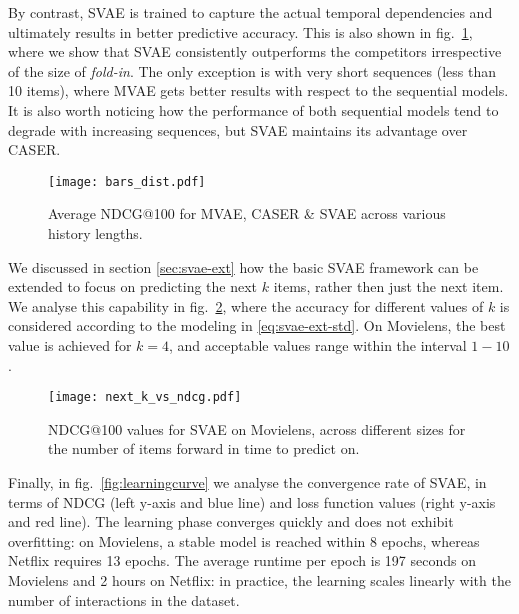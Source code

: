 \documentclass[sigconf]{acmart}
\numberwithin{equation}{section}
\begin{document}
By contrast, SVAE is trained to capture the actual temporal
dependencies and ultimately results in better predictive accuracy.
This is also shown in fig.~\ref{fig:seq_len_vs_ndcg}, where we show
that SVAE consistently outperforms the competitors irrespective of the
size of \textit{fold-in}. The only exception is with very short
sequences (less than 10 items), where MVAE gets better results with
respect to the sequential models. It is also worth noticing how the
performance of both sequential models tend to degrade with increasing
sequences, but SVAE maintains its advantage over CASER. 

\begin{figure}[th!]
  \vspace*{-2mm}
  \centering
  \texttt{[image: bars\_dist.pdf]}
  \vspace*{-8mm}
  \caption{Average NDCG@100 for MVAE, CASER \& SVAE across
    various history lengths.}
  \label{fig:seq_len_vs_ndcg}
\end{figure}




We discussed in section \ref{sec:svae-ext} how the basic SVAE framework can
be extended to focus on predicting the next $k$ items, rather then
just the next item. We analyse this capability in
fig.~\ref{fig:next_k_vs_ndcg}, where the accuracy for different values
of $k$ is considered according to the modeling in
\ref{eq:svae-ext-std}. On Movielens, the best value is achieved for
$k=4$, and acceptable values range within the interval $1-10$.


\begin{figure}[th!]
  \centering
  \texttt{[image: next\_k\_vs\_ndcg.pdf]}
        \vspace*{-4mm}
    \caption{NDCG@100 values for SVAE on Movielens, across different sizes for the
      number of items forward in time to predict on. 
}
    \label{fig:next_k_vs_ndcg}
\end{figure}

Finally, in fig.~\ref{fig:learningcurve} we analyse the convergence
rate of SVAE, in terms of NDCG (left y-axis and blue line) and loss
function values (right y-axis and red line). The learning phase
converges quickly and does not exhibit 
overfitting: on Movielens, a stable model is reached within 8
epochs, whereas Netflix requires 13 epochs. The average runtime per
epoch is 197 seconds on Movielens and 2 hours on Netflix: in practice,
the learning scales linearly with the number of
interactions in the dataset. 
\end{document}
